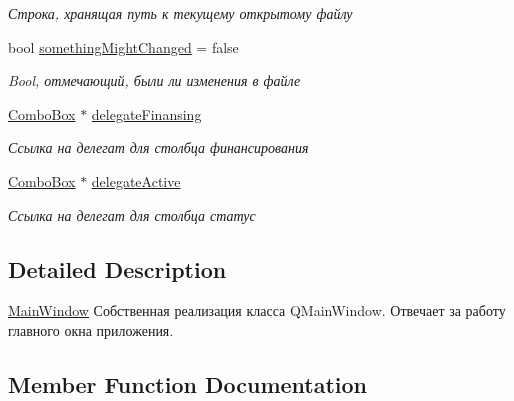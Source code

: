 \begin{DoxyCompactItemize}
\begin{DoxyCompactList}\small\item\em Строка, хранящая путь к текущему открытому файлу \end{DoxyCompactList}\item 
\mbox{\label{class_main_window_a9c8a00a85cc268cf1416b02ce907c005}} 
bool \mbox{\hyperlink{class_main_window_a9c8a00a85cc268cf1416b02ce907c005}{something\+Might\+Changed}} = false
\begin{DoxyCompactList}\small\item\em Bool, отмечающий, были ли изменения в файле \end{DoxyCompactList}\item 
\mbox{\label{class_main_window_af5cbd0f3ab3b0edbd264dd74fec47069}} 
\mbox{\hyperlink{class_combo_box}{Combo\+Box}} $\ast$ \mbox{\hyperlink{class_main_window_af5cbd0f3ab3b0edbd264dd74fec47069}{delegate\+Finansing}}
\begin{DoxyCompactList}\small\item\em Ссылка на делегат для столбца финансирования \end{DoxyCompactList}\item 
\mbox{\label{class_main_window_a5c57051db5b9b4ec10f6467f25356023}} 
\mbox{\hyperlink{class_combo_box}{Combo\+Box}} $\ast$ \mbox{\hyperlink{class_main_window_a5c57051db5b9b4ec10f6467f25356023}{delegate\+Active}}
\begin{DoxyCompactList}\small\item\em Ссылка на делегат для столбца статус \end{DoxyCompactList}\end{DoxyCompactItemize}


\subsection{Detailed Description}
\mbox{\hyperlink{class_main_window}{Main\+Window}} Собственная реализация класса Q\+Main\+Window. Отвечает за работу главного окна приложения. 

\subsection{Member Function Documentation}
\mbox{\label{class_main_window_a1edcbfb7d066c4935f26882fa3fa73d6}} 
